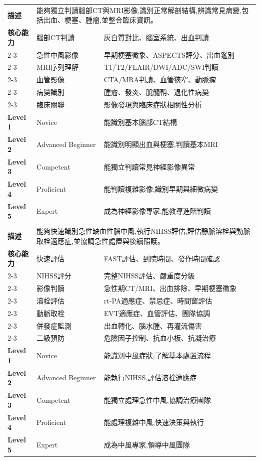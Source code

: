 \documentclass[12pt,a4paper]{article}
\begin{document}
\begin{longtable}{|p{1.2cm}|p{3.8cm}|p{8.5cm}|}
\rowcolor{neuro_blue!10}
\multicolumn{3}{|c|}{\textbf{EPA 2: 神經影像學判讀}} \\
\hline
\textbf{描述} & \multicolumn{2}{|p{12.5cm}|}{能夠獨立判讀腦部CT與MRI影像,識別正常解剖結構,辨識常見病變,包括出血、梗塞、腫瘤,並整合臨床資訊。} \\
\hline
\textbf{核心能力} & 腦部CT判讀 & 灰白質對比、腦室系統、出血判讀 \\
\cline{2-3}
& 急性中風影像 & 早期梗塞徵象、ASPECTS評分、出血鑑別 \\
\cline{2-3}
& MRI序列理解 & T1/T2/FLAIR/DWI/ADC/SWI判讀 \\
\cline{2-3}
& 血管影像 & CTA/MRA判讀、血管狹窄、動脈瘤 \\
\cline{2-3}
& 病變識別 & 腫瘤、發炎、脫髓鞘、退化性病變 \\
\cline{2-3}
& 臨床關聯 & 影像發現與臨床症狀相關性分析 \\
\hline
\textbf{Level 1} & Novice & 能識別基本腦部CT結構 \\
\hline
\textbf{Level 2} & Advanced Beginner & 能識別明顯出血與梗塞,判讀基本MRI \\
\hline
\textbf{Level 3} & Competent & 能獨立判讀常見神經影像異常 \\
\hline
\textbf{Level 4} & Proficient & 能判讀複雜影像,識別早期與細微病變 \\
\hline
\textbf{Level 5} & Expert & 成為神經影像專家,能教導進階判讀 \\
\hline

\rowcolor{neuro_blue!10}
\multicolumn{3}{|c|}{\textbf{EPA 3: 急性缺血性腦中風診斷與處置}} \\
\hline
\textbf{描述} & \multicolumn{2}{|p{12.5cm}|}{能夠快速識別急性缺血性腦中風,執行NIHSS評估,評估靜脈溶栓與動脈取栓適應症,並協調急性處置與後續照護。} \\
\hline
\textbf{核心能力} & 快速評估 & FAST評估、到院時間、發作時間確認 \\
\cline{2-3}
& NIHSS評分 & 完整NIHSS評估、嚴重度分級 \\
\cline{2-3}
& 影像判讀 & 急性期CT/MRI、出血排除、早期梗塞徵象 \\
\cline{2-3}
& 溶栓評估 & rt-PA適應症、禁忌症、時間窗評估 \\
\cline{2-3}
& 動脈取栓 & EVT適應症、血管評估、團隊協調 \\
\cline{2-3}
& 併發症監測 & 出血轉化、腦水腫、再灌流傷害 \\
\cline{2-3}
& 二級預防 & 危險因子控制、抗血小板、抗凝治療 \\
\hline
\textbf{Level 1} & Novice & 能識別中風症狀,了解基本處置流程 \\
\hline
\textbf{Level 2} & Advanced Beginner & 能執行NIHSS,評估溶栓適應症 \\
\hline
\textbf{Level 3} & Competent & 能獨立處理急性中風,協調治療團隊 \\
\hline
\textbf{Level 4} & Proficient & 能處理複雜中風,快速決策與執行 \\
\hline
\textbf{Level 5} & Expert & 成為中風專家,領導中風團隊 \\
\hline


\end{longtable}
\end{document}
